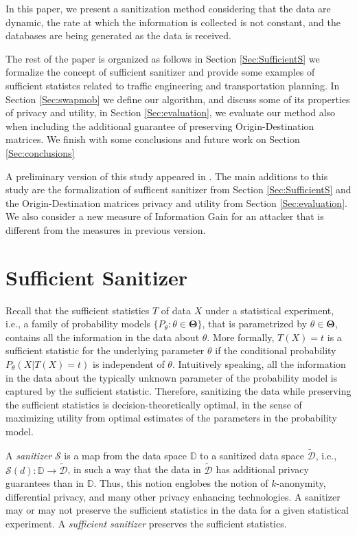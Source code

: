 \documentclass[review]{elsarticle}
\begin{document}
In this paper, we present a sanitization method considering that the data are dynamic, the rate at which the information is collected is not constant, and the databases are being generated as the data is received.

  
The rest of the paper is organized as follows in Section \ref{Sec:SufficientS} we formalize the concept of sufficient sanitizer and provide some examples of sufficient statistcs related to traffic engineering and transportation planning. In Section \ref{Sec:swapmob} we define our algorithm, and discuss some of its properties of privacy and utility, in Section \ref{Sec:evaluation}, we evaluate our method also when including the additional guarantee of preserving Origin-Destination matrices. We finish with some conclusions and future work on Section \ref{Sec:conclusions}

A preliminary version of this study appeared in \cite{Salas:2018-c}. The main additions to this study are the formalization of sufficent sanitizer from Section \ref{Sec:SufficientS} and the Origin-Destination matrices privacy and utility from Section \ref{Sec:evaluation}. We also consider a new measure of Information Gain for an attacker that is different from the measures in previous version.



\section{Sufficient Sanitizer}\label{S:SufficientSanitizer}\label{Sec:SufficientS}

Recall that the sufficient statistics $T$ of data $X$ under a statistical experiment, i.e., a family of probability models $\{P_{\theta}: \theta \in \mathbf{\Theta}\}$, that is parametrized by $\theta \in \mathbf{\Theta}$, contains all the information in the data about $\theta$.  
More formally, $T(X)=t$ is a sufficient statistic for the underlying parameter $\theta$ if the conditional probability $P_{\theta}(X | T(X)=t)$ is independent of $\theta$.  
Intuitively speaking, all the information in the data about the typically unknown parameter of the probability model is captured by the sufficient statistic.  
Therefore, sanitizing the data while preserving the sufficient statistics is decision-theoretically optimal, in the sense of maximizing utility from optimal estimates of the parameters in the probability model.

A {\em sanitizer} $\mathcal{S}$ is a map from the data space $\mathbb{D}$ to a sanitized data space $\tilde{\mathcal{D}}$, i.e., $\mathcal{S}(d): \mathbb{D} \to \tilde{\mathcal{D}}$, in such a way that the data in $\tilde{\mathcal{D}}$ has additional privacy guarantees than in $\mathbb{D}$.
Thus, this notion englobes the notion of $k$-anonymity, differential privacy, and many other privacy enhancing technologies.  
A sanitizer may or may not preserve the sufficient statistics in the data for a given statistical experiment.
A {\em sufficient sanitizer} preserves the sufficient statistics. 
\end{document}
